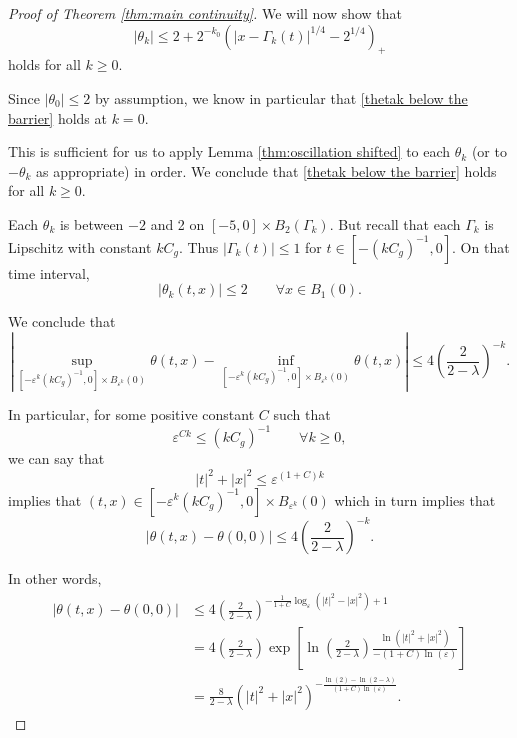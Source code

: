\documentclass[11pt]{amsart}
\theoremstyle{remark}
\theoremstyle{definition}
\newcommand{\eps}{\varepsilon}
\newcommand{\paren}[1]{\left( #1 \right)}
\newcommand{\bracket}[1]{\left[ #1 \right]}
\newcommand{\abs}[1]{\left\lvert #1 \right\rvert}
\newcommand{\n}{^{-1}}
\newcommand{\Cgamma}{C_g}
\begin{document}
\begin{proof}[Proof of Theorem \ref{thm:main continuity}]
We will now show that
\begin{equation}\label{thetak below the barrier}
|\theta_k| \leq 2 + 2^{-k_0} \paren{|x-\Gamma_k(t)|^{1/4} - 2^{1/4}}_+
\end{equation}
holds for all $k \geq 0$.  

Since $|\theta_0|\leq 2$ by assumption, we know in particular that \eqref{thetak below the barrier} holds at $k=0$.  

This is sufficient for us to apply Lemma \ref{thm:oscillation shifted} to each $\theta_k$ (or to $-\theta_k$ as appropriate) in order.  We conclude that \eqref{thetak below the barrier} holds for all $k \geq 0$.  

Each $\theta_k$ is between $-2$ and 2 on $[-5,0]\times B_2(\Gamma_k)$.  But recall that each $\Gamma_k$ is Lipschitz with constant $k \Cgamma$.  Thus $|\Gamma_k(t)|\leq 1$ for $t \in [-(k \Cgamma)\n, 0]$.  On that time interval, 
\[ \abs{\theta_k(t,x)} \leq 2 \qquad \forall x \in B_1(0). \]

We conclude that
\[ \abs{ \sup_{[-\eps^k (k \Cgamma)\n, 0] \times B_{\eps^k}(0)} \theta(t,x) - \inf_{[-\eps^k (k \Cgamma)\n, 0] \times B_{\eps^k}(0)} \theta(t,x) } \leq 4 \paren{\frac{2}{2-\lambda}}^{-k}. \]

In particular, for some positive constant $C$ such that
\[ \eps^{C k} \leq (k \Cgamma)\n \qquad \forall k \geq 0, \]
we can say that
\[ |t|^2 + |x|^2 \leq \eps^{(1+C)k} \]	
implies that $(t,x) \in [-\eps^k (k \Cgamma)\n, 0] \times B_{\eps^k}(0)$ which in turn implies that
\[ \abs{\theta(t,x) - \theta(0,0)} \leq  4 \paren{\frac{2}{2-\lambda}}^{-k}. \]

In other words,
\begin{align*} 
\abs{\theta(t,x) - \theta(0,0)} &\leq 4 \paren{\frac{2}{2-\lambda}}^{ -\frac{1}{1+C} \log_\eps(|t|^2 - |x|^2)  + 1} 
\\ &= 4 \paren{\frac{2}{2-\lambda}} \exp\bracket{\ln\paren{\frac{2}{2-\lambda}} \frac{\ln(|t|^2 + |x|^2)}{-(1+C)\ln(\eps)}}
\\ &= \frac{8}{2-\lambda} (|t|^2 + |x|^2)^{-\frac{\ln(2) - \ln(2-\lambda)}{(1+C)\ln(\eps)}}.
\end{align*}

\end{proof}

\end{document}
